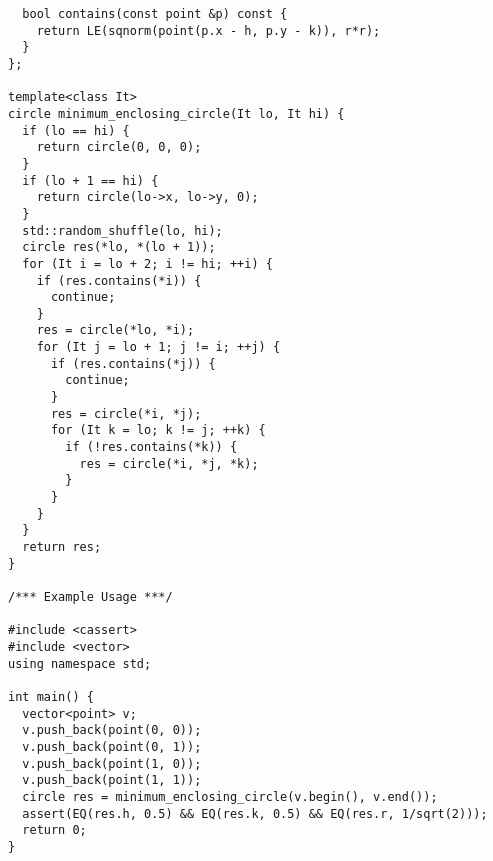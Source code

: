 \begin{lstlisting}
  bool contains(const point &p) const {
    return LE(sqnorm(point(p.x - h, p.y - k)), r*r);
  }
};

template<class It>
circle minimum_enclosing_circle(It lo, It hi) {
  if (lo == hi) {
    return circle(0, 0, 0);
  }
  if (lo + 1 == hi) {
    return circle(lo->x, lo->y, 0);
  }
  std::random_shuffle(lo, hi);
  circle res(*lo, *(lo + 1));
  for (It i = lo + 2; i != hi; ++i) {
    if (res.contains(*i)) {
      continue;
    }
    res = circle(*lo, *i);
    for (It j = lo + 1; j != i; ++j) {
      if (res.contains(*j)) {
        continue;
      }
      res = circle(*i, *j);
      for (It k = lo; k != j; ++k) {
        if (!res.contains(*k)) {
          res = circle(*i, *j, *k);
        }
      }
    }
  }
  return res;
}

/*** Example Usage ***/

#include <cassert>
#include <vector>
using namespace std;

int main() {
  vector<point> v;
  v.push_back(point(0, 0));
  v.push_back(point(0, 1));
  v.push_back(point(1, 0));
  v.push_back(point(1, 1));
  circle res = minimum_enclosing_circle(v.begin(), v.end());
  assert(EQ(res.h, 0.5) && EQ(res.k, 0.5) && EQ(res.r, 1/sqrt(2)));
  return 0;
}
\end{lstlisting}
